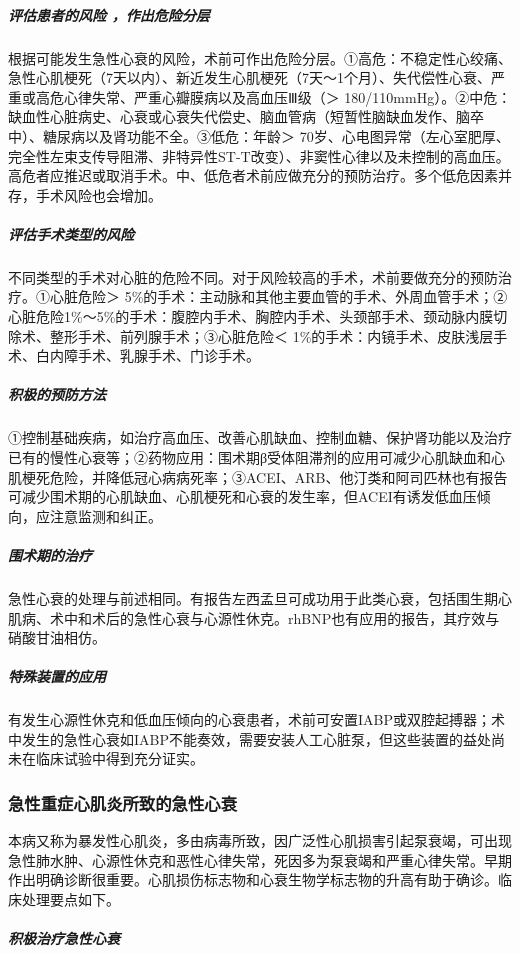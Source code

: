 \subparagraph{评估患者的风险 ，作出危险分层}

根据可能发生急性心衰的风险，术前可作出危险分层。①高危：不稳定性心绞痛、急性心肌梗死（7天以内）、新近发生心肌梗死（7天～1个月）、失代偿性心衰、严重或高危心律失常、严重心瓣膜病以及高血压Ⅲ级（＞
180/110mmHg）。②中危：缺血性心脏病史、心衰或心衰失代偿史、脑血管病（短暂性脑缺血发作、脑卒中）、糖尿病以及肾功能不全。③低危：年龄＞
70岁、心电图异常（左心室肥厚、完全性左束支传导阻滞、非特异性ST-T改变）、非窦性心律以及未控制的高血压。高危者应推迟或取消手术。中、低危者术前应做充分的预防治疗。多个低危因素并存，手术风险也会增加。

\subparagraph{评估手术类型的风险}

不同类型的手术对心脏的危险不同。对于风险较高的手术，术前要做充分的预防治疗。①心脏危险＞
5\%的手术：主动脉和其他主要血管的手术、外周血管手术；②心脏危险1\%～5\%的手术：腹腔内手术、胸腔内手术、头颈部手术、颈动脉内膜切除术、整形手术、前列腺手术；③心脏危险＜
1\%的手术：内镜手术、皮肤浅层手术、白内障手术、乳腺手术、门诊手术。

\subparagraph{积极的预防方法}

①控制基础疾病，如治疗高血压、改善心肌缺血、控制血糖、保护肾功能以及治疗已有的慢性心衰等；②药物应用：围术期β受体阻滞剂的应用可减少心肌缺血和心肌梗死危险，并降低冠心病病死率；③ACEI、ARB、他汀类和阿司匹林也有报告可减少围术期的心肌缺血、心肌梗死和心衰的发生率，但ACEI有诱发低血压倾向，应注意监测和纠正。

\subparagraph{围术期的治疗}

急性心衰的处理与前述相同。有报告左西孟旦可成功用于此类心衰，包括围生期心肌病、术中和术后的急性心衰与心源性休克。rhBNP也有应用的报告，其疗效与硝酸甘油相仿。

\subparagraph{特殊装置的应用}

有发生心源性休克和低血压倾向的心衰患者，术前可安置IABP或双腔起搏器；术中发生的急性心衰如IABP不能奏效，需要安装人工心脏泵，但这些装置的益处尚未在临床试验中得到充分证实。

\subsubsection{急性重症心肌炎所致的急性心衰}

本病又称为暴发性心肌炎，多由病毒所致，因广泛性心肌损害引起泵衰竭，可出现急性肺水肿、心源性休克和恶性心律失常，死因多为泵衰竭和严重心律失常。早期作出明确诊断很重要。心肌损伤标志物和心衰生物学标志物的升高有助于确诊。临床处理要点如下。

\subparagraph{积极治疗急性心衰}

